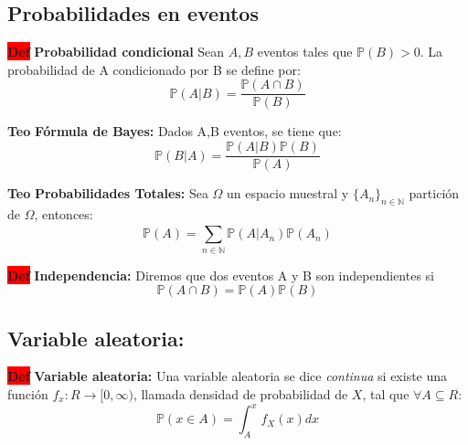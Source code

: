 \documentclass[letterpaper,10.5pt,twocolumn]{article} %
\newcommand{\N}{\mathbb{N} }
\newcommand{\Proba}{\mathbb{P} }
\newcommand{\hlc}[2][yellow]{ \colorbox{#1}{#2} }
\newcommand{\Def}{\hlc[red]{\bfseries Def}}
\newcommand{\Teo}{\hlc[applegreen]{\bfseries Teo}}
\let\oldfrac=\frac
\renewcommand{\frac}[2]{\ensuremath{\oldfrac{#1}{#2}}}
\begin{document}

\subsection{Probabilidades en eventos}

\Def \textbf{Probabilidad condicional} Sean $A,B $ eventos tales
que $\Proba(B) > 0$. La probabilidad de A condicionado por B se
define por:
\begin{equation*}
    \Proba (A|B) = \frac{\Proba (A\cap B)}{\Proba (B)}
\end{equation*}


\Teo \textbf{Fórmula de Bayes:} Dados A,B eventos, se tiene
que:
\begin{equation*}
    \Proba(B|A) = \frac{\Proba (A|B) \Proba (B)}{\Proba (A)}
\end{equation*}


\Teo \textbf{Probabilidades Totales:} Sea $\Omega$ un espacio muestral
y $\{A_n \}_{n \in \N}$  partición de $\Omega$, entonces:
\begin{equation*}
    \Proba (A) = \sum_{n \in \N}^{} \Proba (A|A_n) \Proba (A_n)
\end{equation*}


\Def \textbf{Independencia:} Diremos que dos eventos A y B son
independientes si $$\Proba (A \cap B) = \Proba (A)\Proba (B)$$


\subsection{Variable aleatoria:}

\Def \textbf{Variable aleatoria:}
Una variable aleatoria se dice \textit{continua} si existe una función $f_x : R  \rightarrow [0,\infty)$, llamada densidad de probabilidad de $X$, tal que $\forall A \subseteq R$:
\begin{equation*}
  \Proba (x \in A) = \int_{A}^{x} f_X (x) dx
\end{equation*}
\end{document}
